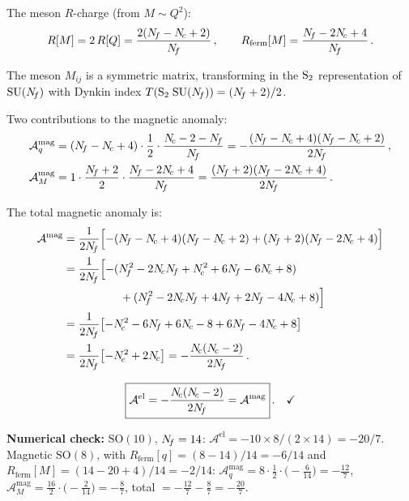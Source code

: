 \documentclass[11pt,a4paper]{article}
\newcommand{\SO}[1]{\mathrm{SO}(#1)}
\begin{document}
The meson $R$-charge (from $M \sim Q^2$):
\begin{equation}\label{eq:SO-RM}
  R[M] = 2\,R[Q] = \frac{2(N_{\!f} - N_{\!c} + 2)}{N_{\!f}}\,,
  \qquad
  R_{\text{ferm}}[M] = \frac{N_{\!f} - 2N_{\!c} + 4}{N_{\!f}}\,.
\end{equation}

The meson $M_{ij}$ is a symmetric matrix, transforming in the
$\mathrm{S}_2$ representation of $\mathrm{SU}(N_{\!f})$ with Dynkin index
$T(\mathrm{S}_2\; \mathrm{SU}(N_{\!f})) = (N_{\!f} + 2)/2$.

Two contributions to the magnetic anomaly:
\begin{align}
  \mathcal{A}^{\text{mag}}_q
  &= (\Nf - \Nc + 4) \cdot \frac{1}{2}
    \cdot \frac{\Nc - 2 - \Nf}{\Nf}
  = -\frac{(\Nf - \Nc + 4)(\Nf - \Nc + 2)}{2\Nf}\,,
  \label{eq:SO-Amag-q} \\
  \mathcal{A}^{\text{mag}}_M
  &= 1 \cdot \frac{\Nf + 2}{2}
    \cdot \frac{\Nf - 2\Nc + 4}{\Nf}
  = \frac{(\Nf + 2)(\Nf - 2\Nc + 4)}{2\Nf}\,.
  \label{eq:SO-Amag-M}
\end{align}

The total magnetic anomaly is:
\begin{align}
  \mathcal{A}^{\text{mag}}
  &= \frac{1}{2\Nf}\Bigl[
    -(\Nf - \Nc + 4)(\Nf - \Nc + 2)
    + (\Nf + 2)(\Nf - 2\Nc + 4)
  \Bigr] \notag \\
  &= \frac{1}{2\Nf}\Bigl[
    -(\Nf^2 - 2\Nc\Nf + \Nc^2 + 6\Nf - 6\Nc + 8)
    \notag \\
  &\qquad\qquad\quad
    + (\Nf^2 - 2\Nc\Nf + 4\Nf + 2\Nf - 4\Nc + 8)
  \Bigr] \notag \\
  &= \frac{1}{2\Nf}\bigl[
    -\Nc^2 - 6\Nf + 6\Nc - 8 + 6\Nf - 4\Nc + 8
  \bigr] \notag \\
  &= \frac{1}{2\Nf}\bigl[-\Nc^2 + 2\Nc\bigr]
  = -\frac{\Nc(\Nc - 2)}{2\Nf}\,.
  \label{eq:SO-Amag-total}
\end{align}

\begin{equation}\label{eq:SO-anomaly-match}
  \boxed{\mathcal{A}^{\text{el}}
    = -\frac{N_{\!c}(N_{\!c} - 2)}{2N_{\!f}}
    = \mathcal{A}^{\text{mag}}}\,.
  \quad\checkmark
\end{equation}

\textbf{Numerical check:} $\SO{10}$, $N_{\!f} = 14$:
$\mathcal{A}^{\text{el}} = -10 \times 8/(2 \times 14) = -20/7$.
Magnetic $\SO{8}$, with $R_{\text{ferm}}[q] = (8 - 14)/14 = -6/14$ and
$R_{\text{ferm}}[M] = (14 - 20 + 4)/14 = -2/14$:
$\mathcal{A}^{\text{mag}}_q = 8 \cdot \tfrac{1}{2} \cdot
\bigl(-\tfrac{6}{14}\bigr) = -\tfrac{12}{7}$,
$\mathcal{A}^{\text{mag}}_M = \tfrac{16}{2} \cdot
\bigl(-\tfrac{2}{14}\bigr) = -\tfrac{8}{7}$,
total $= -\tfrac{12}{7} - \tfrac{8}{7} = -\tfrac{20}{7}$.
\checkmark
\end{document}

